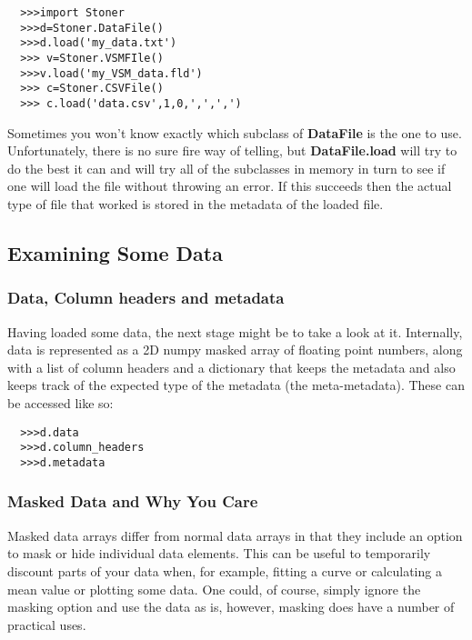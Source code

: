 \documentclass[a4paper,11pt]{scrartcl}
\begin{document}
\begin{verbatim}
  >>>import Stoner
  >>>d=Stoner.DataFile()
  >>>d.load('my_data.txt')
  >>> v=Stoner.VSMFIle()
  >>>v.load('my_VSM_data.fld')
  >>> c=Stoner.CSVFile()
  >>> c.load('data.csv',1,0,',',',')
\end{verbatim}


Sometimes you won't know exactly which subclass of \textbf{DataFile} is the one to use. Unfortunately, there is no sure fire way of telling, but \textbf{DataFile.load} will try to do the best it can and will try all of the subclasses in memory in turn to see if one will load the file without throwing an error. If this succeeds then the actual type of file that worked is stored in the metadata of the loaded file.


\subsection{Examining Some Data}
\subsubsection{Data, Column headers and metadata}
Having loaded some data, the next stage might be to take a look at it.
Internally, data is represented as a 2D numpy masked array of floating point numbers,
along with a list of column headers and a dictionary that keeps the metadata and
also keeps track of the expected type of the metadata (\ie the meta-metadata).
These can be accessed like so:
\begin{verbatim}
  >>>d.data
  >>>d.column_headers
  >>>d.metadata
\end{verbatim}

\subsubsection{Masked Data and Why You Care}
Masked data arrays differ from normal data arrays in that they include an option to mask or hide individual data elements. This can be useful to temporarily discount parts of your data when, for example, fitting a curve or calculating a mean value or plotting some data. One could, of course, simply ignore the masking option and use the data as is, however, masking does have a number of practical uses.
\end{document}
